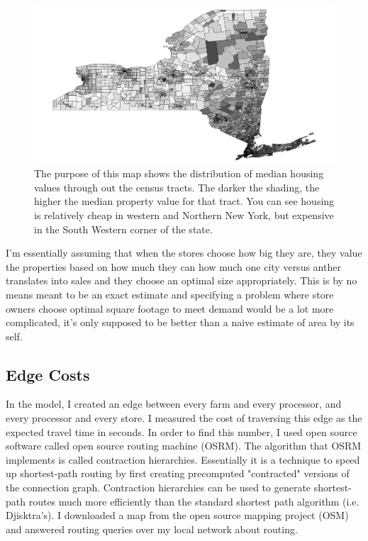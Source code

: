 \documentclass{report}
\begin{document}
\begin{figure}
\centering
\begin{framed}
\includegraphics[scale=.4]{map_4}
\caption{The purpose of this map shows the distribution of median housing values through out the census tracts. The darker the shading, the higher the median property value for that tract. You can see housing is relatively cheap in western and Northern New York, but expensive in the South Western corner of the state.}
\label{fig:map_4}
\end{framed}
\end{figure}

I'm essentially assuming that when the stores choose how big they are, they value the properties based on how much they can how much one city versus anther translates into sales and they choose an optimal size appropriately. This is by no means meant to be an exact estimate and specifying a problem where store owners choose optimal square footage to meet demand would be a lot more complicated, it's only supposed to be better than a naive estimate of area by its self.

\subsection{Edge Costs}

In the model, I created an edge between every farm and every processor, and every processor and every store. I measured the cost of traversing this edge as the expected travel time in seconds. In order to find this number, I used open source software called open source routing machine (OSRM). The algorithm that OSRM implements is called contraction hierarchies. Essentially it is a technique to speed up shortest-path routing by first creating precomputed "contracted" versions of the connection graph. Contraction hierarchies can be used to generate shortest-path routes much more efficiently than the standard shortest path algorithm (i.e. Djisktra's). I downloaded a map from the open source mapping project (OSM) and answered routing queries over my local network about routing.
\end{document}
